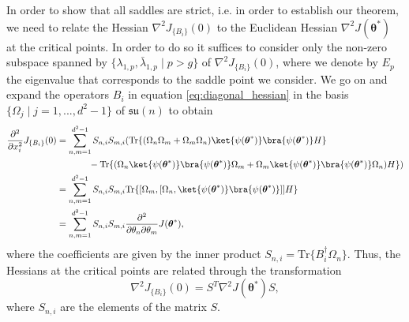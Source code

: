 \documentclass{article}
\renewcommand{\vec}[1]{\ensuremath{\boldsymbol{#1}}}
\begin{document}
In order to show that all saddles are strict, i.e. in order to establish our theorem, we need to relate the Hessian \(\nabla^2 J_{\{B_i\}}(0)\) to the Euclidean Hessian \(\nabla^2 J (\vec{\theta}^*)\) at the critical points. In order to do so it suffices to consider only the non-zero subspace spanned by \(\{\lambda_{1, p}, \bar{\lambda}_{1, p} \mid p > g\}\) of \(\nabla^2 J_{\{B_i\}}(0)\), where we denote by \(E_p\) the eigenvalue that corresponds to the saddle point we consider. We go on and expand the operators \(B_i\) in equation \eqref{eq:diagonal_hessian} in the basis \(\{\Omega_j \mid j=1,...,d^2-1\}\) of \(\mathfrak{su}(n)\) to obtain
\begin{align}
    \frac{\partial^2}{\partial x_i^2} J_{\{B_i\}}(0) & = \sum_{n,m=1}^{d^2-1}S_{n, i} S_{m,i} (\mathrm{Tr}\{(\Omega_n \Omega_m + \Omega_m \Omega_n)\ket{\psi(\vec{\theta}^*)} \bra{\psi(\vec{\theta}^*)} H\} \nonumber \\
    & \hphantom{= \sum_{n,m=1}^{d^2-1}} - \mathrm{Tr} \{(\Omega_n \ket{\psi(\vec{\theta}^*)}\bra{\psi(\vec{\theta}^*)}\Omega_m
     + \Omega_m \ket{\psi(\vec{\theta}^*)} \bra{\psi(\vec{\theta}^*)} \Omega_n) H\}) \nonumber \\
     &=  \sum_{n,m=1}^{d^2-1} S_{n,i} S_{m,i} \mathrm{Tr}\{[\Omega_m, [\Omega_n, \ket{\psi(\vec{\theta}^*)}\bra{\psi(\vec{\theta}^*)}]]H\} \\
    &= \sum_{n, m=1}^{d^2-1} S_{n,i} S_{m,i} \frac{\partial^2}{\partial\theta_n\partial\theta_m}J(\vec{\theta}^*), \nonumber
\end{align}
where the coefficients are given by the inner product \(S_{n,i}=\mathrm{Tr}\{B_i^\dagger \Omega_n\}\).
Thus, the Hessians at the critical points are related through the transformation
\begin{equation}
    \label{eq:basis_change}
    \nabla^2 J_{\{B_i\}}(0) = S^T\nabla^2 J(\vec{\theta}^*) S,
\end{equation}
where \(S_{n,i}\) are the elements of the matrix \(S\).
\end{document}
